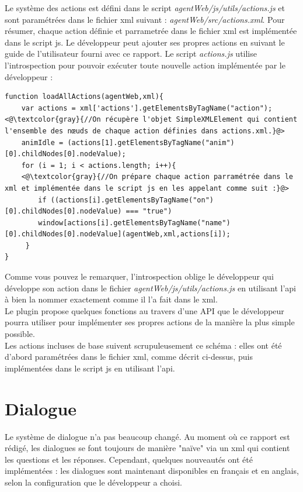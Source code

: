 \documentclass[11pt,dvipsnames,svgnames]{report}
\begin{document}
	Le système des actions est défini dans le script \emph{agentWeb/js/utils/actions.js} et sont paramétrées dans le fichier xml suivant : \emph{agentWeb/src/actions.xml}. Pour résumer, chaque action définie et parrametrée dans le fichier xml est implémentée dans le script js. Le développeur peut ajouter ses propres actions en suivant le guide de l'utilisateur fourni avec ce rapport. Le script \emph{actions.js} utilise l'introspection pour pouvoir exécuter toute nouvelle action implémentée par le développeur : \\
	\begin{lstlisting}
function loadAllActions(agentWeb,xml){
  	var actions = xml['actions'].getElementsByTagName("action"); <@\textcolor{gray}{//On récupère l'objet SimpleXMLElement qui contient l'ensemble des nœuds de chaque action définies dans actions.xml.}@>
  	animIdle = (actions[1].getElementsByTagName("anim")[0].childNodes[0].nodeValue);
  	for (i = 1; i < actions.length; i++){
  	<@\textcolor{gray}{//On prépare chaque action parramétrée dans le xml et implémentée dans le script js en les appelant comme suit :}@>
    	if ((actions[i].getElementsByTagName("on")[0].childNodes[0].nodeValue) === "true")
     	window[actions[i].getElementsByTagName("name")[0].childNodes[0].nodeValue](agentWeb,xml,actions[i]);
     }
}
\end{lstlisting} 

	Comme vous pouvez le remarquer, l'introspection oblige le développeur qui développe son action dans le fichier \emph{agentWeb/js/utils/actions.js} en utilisant l'api à bien la nommer exactement comme il l'a fait dans le xml.\\	
	
	Le plugin propose quelques fonctions au travers d'une API que le développeur pourra utiliser pour implémenter ses propres actions de la manière la plus simple possible.\\
	
	Les actions incluses de base suivent scrupuleusement ce schéma : elles ont été d'abord paramétrées dans le fichier xml, comme décrit ci-dessus, puis implémentées dans le script js en utilisant l'api.
	
	\section{Dialogue}
	
	Le système de dialogue n'a pas beaucoup changé. Au moment où ce rapport est rédigé, les dialogues se font toujours de manière "naïve" via un xml qui contient les questions et les réponses. Cependant, quelques nouveautés ont été implémentées : les dialogues sont maintenant disponibles en français et en anglais, selon la configuration que le développeur a choisi.\\
	
\end{document}
